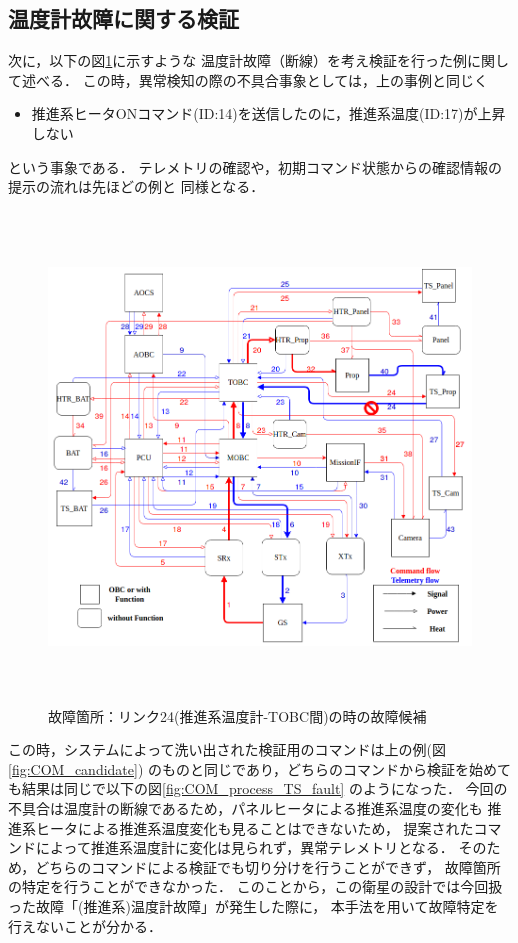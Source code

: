 \documentclass[11pt]{jsreport}
\begin{document}
\subsection{温度計故障に関する検証}%
次に，以下の図\ref{fig:fault_mode2}に示すような
温度計故障（断線）を考え検証を行った例に関して述べる．
この時，異常検知の際の不具合事象としては，上の事例と同じく
\begin{itemize}
   \item 推進系ヒータONコマンド(ID:14)を送信したのに，推進系温度(ID:17)が上昇しない
\end{itemize}
という事象である．
テレメトリの確認や，初期コマンド状態からの確認情報の提示の流れは先ほどの例と
同様となる．
\begin{figure}[H]
   \centering
      \includegraphics[height=13.0cm]{figure/fault_mode2.png}
      \caption{故障箇所：リンク24(推進系温度計-TOBC間)の時の故障候補}
      \label{fig:fault_mode2}
\end{figure}
この時，システムによって洗い出された検証用のコマンドは上の例(図\ref{fig:COM_candidate})
のものと同じであり，どちらのコマンドから検証を始めても結果は同じで以下の図\ref{fig:COM_process_TS_fault}
のようになった．
今回の不具合は温度計の断線であるため，パネルヒータによる推進系温度の変化も
推進系ヒータによる推進系温度変化も見ることはできないため，
提案されたコマンドによって推進系温度計に変化は見られず，異常テレメトリとなる．
そのため，どちらのコマンドによる検証でも切り分けを行うことができず，
故障箇所の特定を行うことができなかった．
このことから，この衛星の設計では今回扱った故障「(推進系)温度計故障」が発生した際に，
本手法を用いて故障特定を行えないことが分かる．\\
\end{document}
